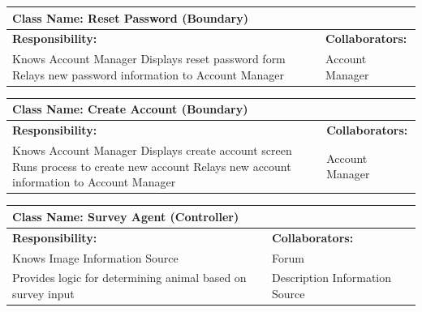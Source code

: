 \documentclass[]{article}
\begin{document}
	\begin{table}[H]
	    \centering
	    \begin{tabular}{|p{7cm}|p{7cm}|}
	    \hline 
	     \multicolumn{2}{|l|}{\textbf{Class Name: Reset Password (Boundary)}} \\
	    \hline
	    \textbf{Responsibility:} & \textbf{Collaborators:} \\
	    \hline
	    Knows Account Manager \newline
		Displays reset password form \newline 
		Relays new password information to Account Manager & 		
	    Account Manager \\
	    \hline
	    \end{tabular}
	\end{table}

	\begin{table}[H]
	    \centering
	    \begin{tabular}{|p{7cm}|p{7cm}|}
	    \hline 
	     \multicolumn{2}{|l|}{\textbf{Class Name: Create Account (Boundary)}} \\
	    \hline
	    \textbf{Responsibility:} & \textbf{Collaborators:} \\
	    \hline
		Knows Account Manager \newline
		Displays create account screen \newline
		Runs process to create new account \newline 
		Relays new account information to Account Manager & 		
	    Account Manager \\
	    \hline
	    \end{tabular}
	\end{table}

	\begin{table}[H]
		\centering
		\begin{tabular}{|p{7cm}|p{7cm}|}
		\hline 
		 \multicolumn{2}{|l|}{\textbf{Class Name: Survey Agent (Controller)}} \\
		\hline
		\textbf{Responsibility:} & \textbf{Collaborators:} \\
		\hline
		Knows Image Information Source & Forum \\
        Provides logic for determining animal based on survey input  & Description Information Source \\
        
		\end{tabular}
	\end{table}
\end{document}
